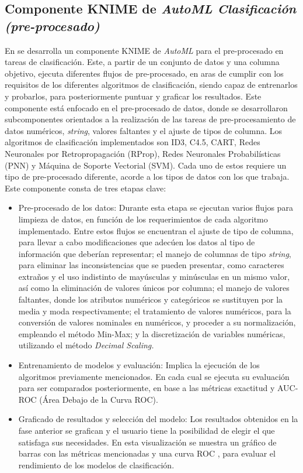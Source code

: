 \subsection{Componente KNIME de \textit{AutoML Clasificación (pre-procesado)}}\label{sec:componente-knime-de-automl-clasificacion-pre-procesado}
En \citep{Carrazana2022} se desarrolla un componente KNIME de \textit{AutoML} para el pre-procesado en tareas de clasificación. Este, a partir de un conjunto de datos y una columna objetivo, ejecuta diferentes flujos de pre-procesado, en aras de cumplir con los requisitos de los diferentes algoritmos de clasificación, siendo capaz de entrenarlos y probarlos, para posteriormente puntuar y graficar los resultados. Este componente está enfocado en el pre-procesado de datos, donde se desarrollaron subcomponentes orientados a la realización de las tareas de pre-procesamiento de datos numéricos, \textit{string}, valores faltantes y el ajuste de tipos de columna. Los algoritmos de clasificación implementados son ID3, C4.5, CART, Redes Neuronales por Retropropagación (RProp), Redes Neuronales Probabilísticas (PNN) y Máquina de Soporte Vectorial (SVM). Cada uno de estos requiere un tipo de pre-procesado diferente, acorde a los tipos de datos con los que trabaja. Este componente consta de tres etapas clave:

\begin{itemize}
	\item Pre-procesado de los datos: Durante esta etapa se ejecutan varios flujos para limpieza de datos, en función de los requerimientos de cada algoritmo implementado. Entre estos flujos se encuentran el ajuste de tipo de columna, para llevar a cabo modificaciones que adecúen los datos al tipo de información que deberían representar; el manejo de columnas de tipo \textit{string}, para eliminar las inconsistencias que se pueden presentar, como caracteres extraños y el uso indistinto de mayúsculas y minúsculas en un mismo valor, así como la eliminación de valores únicos por columna; el manejo de valores faltantes, donde los atributos numéricos y categóricos se sustituyen por la media y moda respectivamente; el tratamiento de valores numéricos, para la conversión de valores nominales en numéricos, y proceder a su normalización, empleando el método Min-Max; y la discretización de variables numéricas, utilizando el método \textit{Decimal Scaling.}
	\item Entrenamiento de modelos y evaluación: Implica la ejecución de los algoritmos previamente mencionados. En cada cual se ejecuta su evaluación para ser comparados posteriormente, en base a las métricas exactitud y AUC-ROC (Área Debajo de la Curva ROC).
	\item Graficado de resultados y selección del modelo: Los resultados obtenidos en la fase anterior se grafican y  el usuario tiene la posibilidad de elegir el que satisfaga sus necesidades. En esta visualización se muestra un gráfico de barras con las métricas mencionadas y una curva ROC , para evaluar el rendimiento de los modelos de clasificación. 
\end{itemize}

